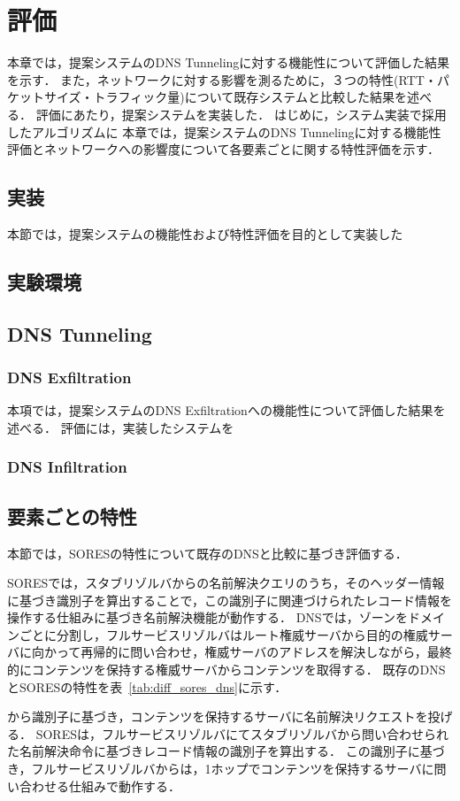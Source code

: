 \section{評価}
本章では，提案システムのDNS Tunnelingに対する機能性について評価した結果を示す．
また，ネットワークに対する影響を測るために，３つの特性(RTT・パケットサイズ・トラフィック量)について既存システムと比較した結果を述べる．
評価にあたり，提案システムを実装した．
はじめに，システム実装で採用したアルゴリズムに
本章では，提案システムのDNS Tunnelingに対する機能性評価とネットワークへの影響度について各要素ごとに関する特性評価を示す．
\subsection{実装}
本節では，提案システムの機能性および特性評価を目的として実装した
\subsection{実験環境}
\subsection{DNS Tunneling}
\subsubsection{DNS Exfiltration}
本項では，提案システムのDNS Exfiltrationへの機能性について評価した結果を述べる．
評価には，実装したシステムを
\subsubsection{DNS Infiltration}
\subsection{要素ごとの特性}
本節では，SORESの特性について既存のDNSと比較に基づき評価する．

SORESでは，スタブリゾルバからの名前解決クエリのうち，そのヘッダー情報に基づき識別子を算出することで，この識別子に関連づけられたレコード情報を操作する仕組みに基づき名前解決機能が動作する．
DNSでは，ゾーンをドメインごとに分割し，フルサービスリゾルバはルート権威サーバから目的の権威サーバに向かって再帰的に問い合わせ，権威サーバのアドレスを解決しながら，最終的にコンテンツを保持する権威サーバからコンテンツを取得する．
既存のDNSとSORESの特性を表~\ref{tab:diff_sores_dns}に示す．



から識別子に基づき，コンテンツを保持するサーバに名前解決リクエストを投げる．
SORESは，フルサービスリゾルバにてスタブリゾルバから問い合わせられた名前解決命令に基づきレコード情報の識別子を算出する．
この識別子に基づき，フルサービスリゾルバからは，1ホップでコンテンツを保持するサーバに問い合わせる仕組みで動作する．
